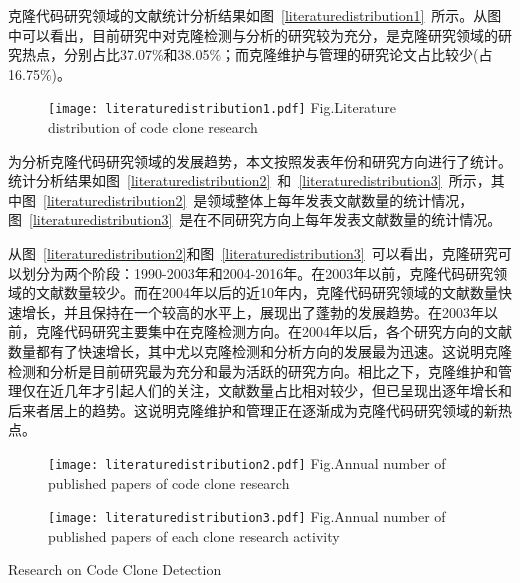 克隆代码研究领域的文献统计分析结果如图~\ref{literaturedistribution1}~所示。从图中可以看出，目前研究中对克隆检测与分析的研究较为充分，是克隆研究领域的研究热点，分别占比37.07\%和38.05\%；而克隆维护与管理的研究论文占比较少(占16.75\%)。

\begin{figure}[htbp]
\centering
\texttt{[image: literaturedistribution1.pdf]}
{Fig.$\!$}{Literature distribution of code clone research}
\vspace{-1em}
\end{figure}

为分析克隆代码研究领域的发展趋势，本文按照发表年份和研究方向进行了统计。统计分析结果如图~\ref{literaturedistribution2}~和~\ref{literaturedistribution3}~所示，其中图~\ref{literaturedistribution2}~是领域整体上每年发表文献数量的统计情况，图~\ref{literaturedistribution3}~是在不同研究方向上每年发表文献数量的统计情况。

从图~\ref{literaturedistribution2}和图~\ref{literaturedistribution3}~可以看出，克隆研究可以划分为两个阶段：1990-2003年和2004-2016年。在2003年以前，克隆代码研究领域的文献数量较少。而在2004年以后的近10年内，克隆代码研究领域的文献数量快速增长，并且保持在一个较高的水平上，展现出了蓬勃的发展趋势。在2003年以前，克隆代码研究主要集中在克隆检测方向。在2004年以后，各个研究方向的文献数量都有了快速增长，其中尤以克隆检测和分析方向的发展最为迅速。这说明克隆检测和分析是目前研究最为充分和最为活跃的研究方向。相比之下，克隆维护和管理仅在近几年才引起人们的关注，文献数量占比相对较少，但已呈现出逐年增长和后来者居上的趋势。这说明克隆维护和管理正在逐渐成为克隆代码研究领域的新热点。

\begin{figure}[htbp]
\centering
\texttt{[image: literaturedistribution2.pdf]}
{Fig.$\!$}{Annual number of published papers of code clone research}
\vspace{-1em}
\end{figure}

\begin{figure}[htbp]
\centering
\texttt{[image: literaturedistribution3.pdf]}
{Fig.$\!$}{Annual number of published papers of each clone research activity}
\end{figure}


{Research on Code Clone Detection }
\label{ref-detection}


